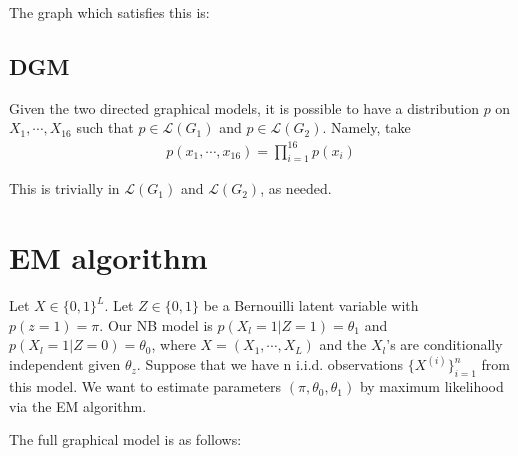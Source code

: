 \documentclass[paper=a4, fontsize=11pt]{scrartcl} %
\numberwithin{equation}{section} %
\numberwithin{figure}{section} %
\numberwithin{table}{section} %
\begin{document}
The graph which satisfies this is:
\\


\subsection{DGM}

Given the two directed graphical models, it is possible to have
a distribution $p$ on $X_1 , \cdots , X_{16}$ such that $p \in \mathcal{L}(G_1)$ and $p \in \mathcal{L}(G_2)$. Namely, take 
\begin{align}
p(x_1 , \cdots , x_{16}) = \prod_{i=1}^{16}p(x_i)
\end{align}

This is trivially in $\mathcal{L}(G_1)$ and $\mathcal{L}(G_2)$, as needed.

\section{EM algorithm}

Let $X \in \{0, 1\}^L$. Let $Z \in \{0, 1\}$ be a Bernouilli latent variable  with $p(z = 1) = \pi$. Our NB model is
$p(X_l = 1|Z = 1) = \theta_1$ and $p(X_l = 1|Z = 0) = \theta_0$, where $X = (X_1, \cdots, X_L)$ and the $X_l$'s are conditionally independent given $\theta_z$.
Suppose that we have n i.i.d. observations $\{X^{(i)}\}_{i=1}^n$ from this model. We want to estimate parameters $(\pi, \theta_0, \theta_1)$ by maximum likelihood via the EM algorithm.

The full graphical model is as follows:
\\

\\
\end{document}
